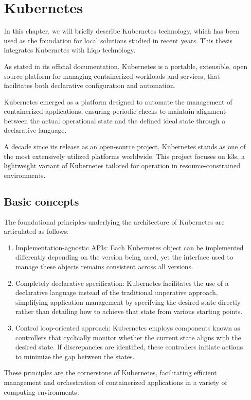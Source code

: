 \chapter{Kubernetes}
In this chapter, we will briefly describe Kubernetes technology, which has been used as the foundation for local solutions studied in recent years. This thesis integrates Kubernetes with Liqo technology.

As stated in its official documentation\cite{k0-1}, Kubernetes is a portable, extensible, open source platform for managing containerized workloads and services, that facilitates both declarative configuration and automation.

Kubernetes emerged as a platform designed to automate the management of containerized applications, ensuring periodic checks to maintain alignment between the actual operational state and the defined ideal state through a declarative language.

A decade since its release as an open-source project, Kubernetes stands as one of the most extensively utilized platforms worldwide. This project focuses on k3s, a lightweight variant of Kubernetes tailored for operation in resource-constrained environments.

\section{Basic concepts}
The foundational principles underlying the architecture of Kubernetes are articulated as follows:
\begin{enumerate}
\item Implementation-agnostic APIs: Each Kubernetes object can be implemented differently depending on the version being used, yet the interface used to manage these objects remains consistent across all versions.
\item Completely declarative specification: Kubernetes facilitates the use of a declarative language instead of the traditional imperative approach, simplifying application management by specifying the desired state directly rather than detailing how to achieve that state from various starting points.
\item Control loop-oriented approach: Kubernetes employs components known as controllers that cyclically monitor whether the current state aligns with the desired state. If discrepancies are identified, these controllers initiate actions to minimize the gap between the states.
\end{enumerate}
These principles are the cornerstone of Kubernetes, facilitating efficient management and orchestration of containerized applications in a variety of computing environments.

